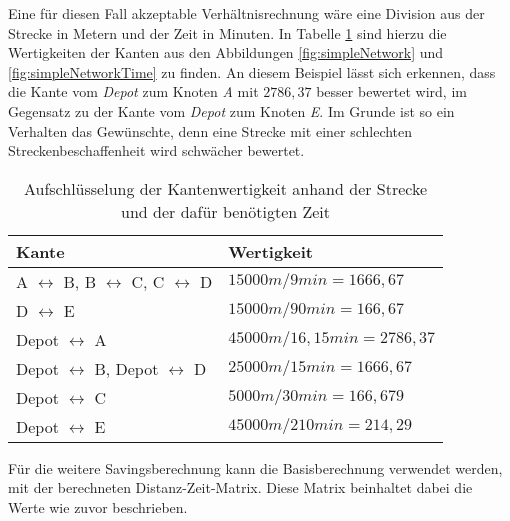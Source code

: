\noindent
Eine für diesen Fall akzeptable Verhältnisrechnung wäre eine Division aus der Strecke in Metern und der Zeit in Minuten. 
In Tabelle \ref{tab:disTimeValues} sind hierzu die Wertigkeiten der Kanten aus den Abbildungen \ref{fig:simpleNetwork} und \ref{fig:simpleNetworkTime} zu finden. 
An diesem Beispiel lässt sich erkennen, dass die Kante vom \textit{Depot} zum Knoten \textit{A} mit $2786,37$ besser bewertet wird, im Gegensatz zu der Kante vom \textit{Depot} zum Knoten \textit{E}. 
Im Grunde ist so ein Verhalten das Gewünschte, denn eine Strecke mit einer schlechten Streckenbeschaffenheit wird schwächer bewertet. 
\begin{table}[htb]%
\centering%
\begin{tabular}{p{5cm}|p{5cm}}
Kante & Wertigkeit \\ 
\hline 
A $\leftrightarrow$ B, B $\leftrightarrow$ C, C $\leftrightarrow$ D & $15000m / 9min = 1666,67$ \\ 
D $\leftrightarrow$ E & $15000m / 90min = 166,67$ \\ 
Depot $\leftrightarrow$ A & $45000m / 16,15min = 2786,37$ \\ 
Depot $\leftrightarrow$ B, Depot $\leftrightarrow$ D & $25000m / 15min = 1666,67$ \\ 
Depot $\leftrightarrow$ C & $5000m / 30min = 166,679$ \\ 
Depot $\leftrightarrow$ E & $45000m / 210min = 214,29$ \\
\end{tabular} 
\caption{Aufschlüsselung der Kantenwertigkeit anhand der Strecke und der dafür benötigten Zeit}
\label{tab:disTimeValues}
\end{table}
Für die weitere Savingsberechnung kann die Basisberechnung verwendet werden, mit der berechneten Distanz-Zeit-Matrix. 
Diese Matrix beinhaltet dabei die Werte wie zuvor beschrieben. 


